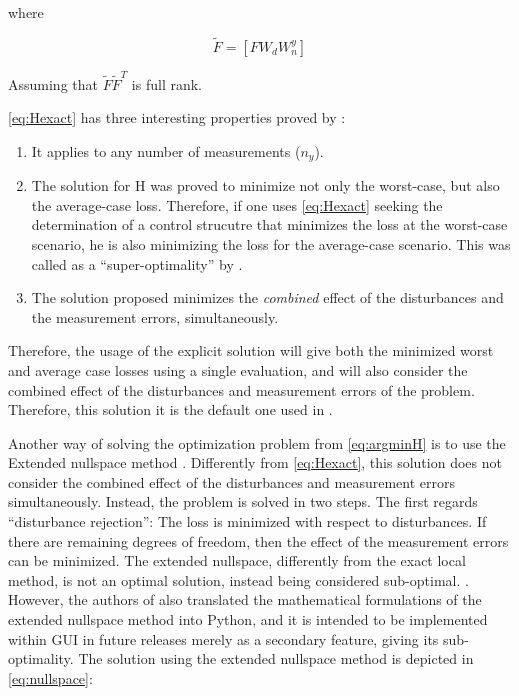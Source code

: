\documentclass[../msc-thesis.tex]{subfiles}
\begin{document}
where

\begin{equation}
	\tilde{F}=\left[F W_{d} W_{n}^{y}\right]
	\label{eq:Ftilde}
\end{equation}

Assuming that $\tilde{F} \tilde{F}^{T}$ is full rank.

\autoref{eq:Hexact} has three interesting properties proved by 
\textcite{Alstad2009}: 

\begin{enumerate}
	\item It applies to any number of measurements ($n_{y}$).
	
	\item The solution for H was proved to minimize not only the worst-case, but 
	also the average-case loss. Therefore, if one uses \autoref{eq:Hexact} 
	seeking the determination of a control strucutre that minimizes the loss at 
	the worst-case scenario, he is also minimizing the loss for the average-case 
	scenario. This was called as a ``super-optimality'' by \textcite{Alstad2009}.

	\item The solution proposed minimizes the \textit{combined} effect of the 
	disturbances and the measurement errors, simultaneously.
\end{enumerate}

Therefore, the usage of the explicit solution will give both the minimized worst 
and average case losses using a single evaluation, and will also consider the 
combined effect of the disturbances and measurement errors of the problem. 
Therefore, this solution it is the default one used in \mtc.

Another way of solving the optimization problem from \autoref{eq:argminH} is to 
use the Extended nullspace method \cite{Alstad2009}. Differently from 
\autoref{eq:Hexact}, this solution does not consider the combined effect of the 
disturbances and measurement errors simultaneously. Instead, the problem is 
solved in two steps. The first regards ``disturbance rejection'': The loss is 
minimized with respect to disturbances. If there are remaining degrees of 
freedom, then the effect of the measurement errors can be minimized. The 
extended nullspace, differently from the exact local method, is not an optimal 
solution, instead being considered sub-optimal. \cite{Alstad2007,Alstad2009}. 
However, the authors of \textcite{Alves2018} also translated the mathematical 
formulations of the extended nullspace method into Python, and it is intended 
to be implemented within \mtc GUI in future releases merely as a secondary 
feature, giving its sub-optimality. The solution using the extended nullspace 
method is depicted in \autoref{eq:nullspace}:
\end{document}
